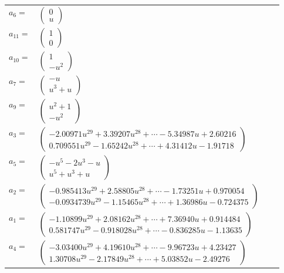 \documentclass[1p]{elsarticle_modified}
\theoremstyle{definition}
\begin{document}
\begin{tabular}{m{7pt} m{180pt} m{7pt} m{180pt} }
\flushright $a_{6}=$&$\begin{pmatrix}0\\u\end{pmatrix}$ \\
\flushright $a_{11}=$&$\begin{pmatrix}1\\0\end{pmatrix}$ \\
\flushright $a_{10}=$&$\begin{pmatrix}1\\- u^2\end{pmatrix}$ \\
\flushright $a_{7}=$&$\begin{pmatrix}- u\\u^3+u\end{pmatrix}$ \\
\flushright $a_{9}=$&$\begin{pmatrix}u^2+1\\- u^2\end{pmatrix}$ \\
\flushright $a_{3}=$&$\begin{pmatrix}-2.00971 u^{29}+3.39207 u^{28}+\cdots-5.34987 u+2.60216\\0.709551 u^{29}-1.65242 u^{28}+\cdots+4.31412 u-1.91718\end{pmatrix}$ \\
\flushright $a_{5}=$&$\begin{pmatrix}- u^5-2 u^3- u\\u^5+u^3+u\end{pmatrix}$ \\
\flushright $a_{2}=$&$\begin{pmatrix}-0.985413 u^{29}+2.58805 u^{28}+\cdots-1.73251 u+0.970054\\-0.0934739 u^{29}-1.15465 u^{28}+\cdots+1.36986 u-0.724375\end{pmatrix}$ \\
\flushright $a_{1}=$&$\begin{pmatrix}-1.10899 u^{29}+2.08162 u^{28}+\cdots+7.36940 u+0.914484\\0.581747 u^{29}-0.918028 u^{28}+\cdots-0.836285 u-1.13635\end{pmatrix}$ \\
\flushright $a_{4}=$&$\begin{pmatrix}-3.03400 u^{29}+4.19610 u^{28}+\cdots-9.96723 u+4.23427\\1.30708 u^{29}-2.17849 u^{28}+\cdots+5.03852 u-2.49276\end{pmatrix}$ \\

\end{tabular}
\end{document}
